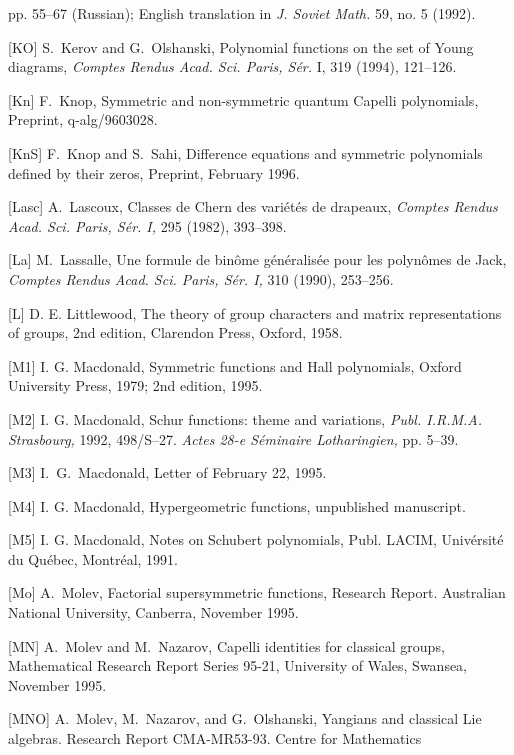 pp. 55--67 (Russian); English translation in {\it J. Soviet Math.} 59, no.
5  (1992). 
\item{[KO]} {\smc S.~Kerov and G.~Olshanski,}  
Polynomial functions on the set of Young diagrams,  
{\it Comptes Rendus Acad. Sci. Paris, S\'er.\/} I, 319 (1994), 
121--126.
\item{[Kn]} {\smc F.~Knop,} Symmetric and non-symmetric quantum
Capelli polynomials, Preprint, q-alg/9603028.
\item{[KnS]} {\smc F.~Knop and S.~Sahi,} Difference equations and
symmetric polynomials defined by their zeros, Preprint, February 1996.
\item{[Lasc]} {\smc A.~Lascoux,} Classes de Chern des vari\'et\'es de
drapeaux, {\it Comptes Rendus Acad. Sci. Paris, S\'er. I, \/} 295 (1982),
393--398.
\item{[La]} {\smc M.~Lassalle,} Une formule de bin\^ome
g\'en\'eralis\'ee pour les polyn\^omes de Jack,  {\it Comptes Rendus
Acad. Sci. Paris, S\'er. I,\/} 310 (1990), 253--256.
\item{[L]} {\smc D. E. Littlewood,} The theory of group characters and  
matrix representations of groups, 2nd edition, Clarendon Press,  Oxford, 
1958. 
\item{[M1]} {\smc I. G. Macdonald,}  
Symmetric functions and Hall polynomials, Oxford University Press, 1979;
2nd edition, 1995.
\item{[M2]} {\smc I. G. Macdonald,}  
Schur functions: theme and variations,  
{\it Publ. I.R.M.A. Strasbourg,\/} 1992, 498/S--27.  
{\it Actes 28-e S\'eminaire Lotharingien,\/} pp. 5--39. 
\item{[M3]} {\smc I.~G.~Macdonald,} Letter of February 22, 1995.
\item{[M4]} {\smc I. G. Macdonald,} Hypergeometric functions, unpublished
manuscript.
\item{[M5]} {\smc I. G. Macdonald,} Notes on Schubert polynomials, Publ.
LACIM, Univ\'ersit\'e du Qu\'ebec, Montr\'eal, 1991.
\item{[Mo]} {\smc A.~Molev,} Factorial supersymmetric functions, 
Research Report. Australian National University, Canberra, November 1995.
\item{[MN]} {\smc A.~Molev and M.~Nazarov,} Capelli identities 
for classical groups, Mathematical Research Report Series 95-21,
University of Wales, Swansea, November 1995.
\item{[MNO]} {\smc A.~Molev, M.~Nazarov, and G.~Olshanski,\/} Yangians and
classical Lie algebras. Research Report CMA-MR53-93. Centre for Mathematics 
